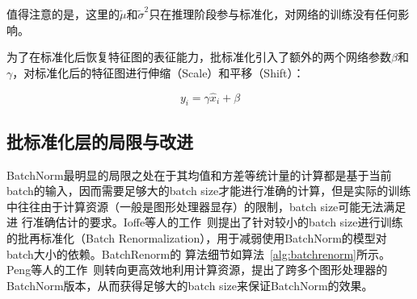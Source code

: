 值得注意的是，这里的$\tilde{\mu}$和$\tilde{\sigma}^2$只在推理阶段参与标准化，对网络的训练没有任何影响。

为了在标准化后恢复特征图的表征能力，批标准化引入了额外的两个网络参数$\beta$和$\gamma$，对标准化后的特征图进行伸缩（Scale）和平移（Shift）：

\begin{equation}
  y_{i}=\gamma \widehat{x}_{i}+\beta
\end{equation}


\subsection{批标准化层的局限与改进}
\label{section:problem}

BatchNorm最明显的局限之处在于其均值和方差等统计量的计算都是基于当前batch的输入，因而需要足够大的batch size才能进行准确的计算，但是实际的训练中往往由于计算资源（一般是图形处理器显存）的限制，batch size可能无法满足进
行准确估计的要求。Ioffe等人的工作~\citep{ioffe2017batch}则提出了针对较小的batch size进行训练的批再标准化（Batch Renormalization），用于减弱使用BatchNorm的模型对batch大小的依赖。BatchRenorm的
算法细节如算法~\ref{alg:batchrenorm}所示。
Peng等人的工作~\citep{peng_megdet:_2018}则转向更高效地利用计算资源，提出了跨多个图形处理器的BatchNorm版本，从而获得足够大的batch size来保证BatchNorm的效果。

